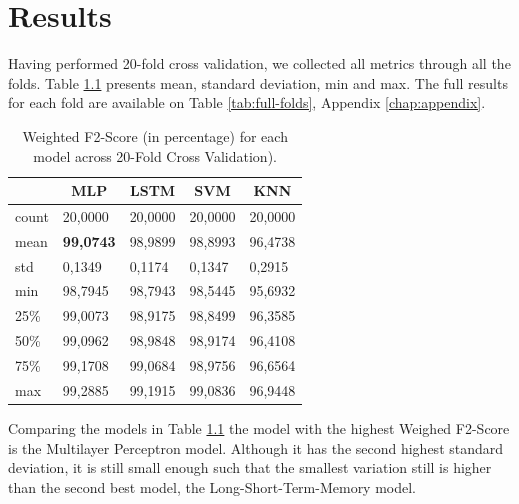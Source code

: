\newpage

\chapter{Results}
\label{chap:results}

Having performed 20-fold cross validation, we collected all metrics through all the folds. Table \ref{tab:cross-validation-results} presents mean, standard deviation, min and max. The full results for each fold are available on Table \ref{tab:full-folds}, Appendix \ref{chap:appendix}.

\begin{table}[!ht]
\centering
\caption{Weighted F2-Score (in percentage) for each model across 20-Fold Cross Validation).}
\begin{tabular}{l|l|l|l|l}
      & \multicolumn{1}{c|}{MLP} & \multicolumn{1}{c|}{LSTM} & \multicolumn{1}{c|}{SVM} & \multicolumn{1}{c}{KNN} \\ \hline
count & 20,0000                  & 20,0000                   & 20,0000                  & 20,0000                 \\ \hline
mean  & \textbf{99,0743}                  & 98,9899                   & 98,8993                  & 96,4738                 \\ \hline
std   & 0,1349                   & 0,1174                    & 0,1347                   & 0,2915                  \\ \hline
min   & 98,7945                  & 98,7943                   & 98,5445                  & 95,6932                 \\ \hline
25\%  & 99,0073                  & 98,9175                   & 98,8499                  & 96,3585                 \\ \hline
50\%  & 99,0962                  & 98,9848                   & 98,9174                  & 96,4108                 \\ \hline
75\%  & 99,1708                  & 99,0684                   & 98,9756                  & 96,6564                 \\ \hline
max   & 99,2885                  & 99,1915                   & 99,0836                  & 96,9448                
\end{tabular}
\label{tab:cross-validation-results}
\end{table}

Comparing the models in Table \ref{tab:cross-validation-results} the model with the highest Weighed F2-Score is the Multilayer Perceptron model. Although it has the second highest standard deviation, it is still small enough such that the smallest variation still is higher than the second best model, the Long-Short-Term-Memory model.

